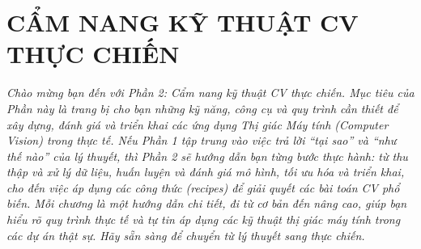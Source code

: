 \part{CẨM NANG KỸ THUẬT CV THỰC CHIẾN}
\setcounter{chapter}{0}
\textit{Chào mừng bạn đến với Phần 2: Cẩm nang kỹ thuật CV thực chiến. 
	Mục tiêu của Phần này là trang bị cho bạn những kỹ năng, công cụ và quy trình 
	cần thiết để xây dựng, đánh giá và triển khai các ứng dụng Thị giác Máy tính (Computer Vision) 
	trong thực tế. Nếu Phần 1 tập trung vào việc trả lời ``tại sao'' và ``như thế nào'' của lý thuyết, 
	thì Phần 2 sẽ hướng dẫn bạn từng bước thực hành: từ thu thập và xử lý dữ liệu, 
	huấn luyện và đánh giá mô hình, tối ưu hóa và triển khai, 
	cho đến việc áp dụng các công thức (recipes) để giải quyết các bài toán CV phổ biến. 
	Mỗi chương là một hướng dẫn chi tiết, đi từ cơ bản đến nâng cao, giúp bạn hiểu rõ quy trình thực tế 
	và tự tin áp dụng các kỹ thuật thị giác máy tính trong các dự án thật sự. 
	Hãy sẵn sàng để chuyển từ lý thuyết sang thực chiến.}
